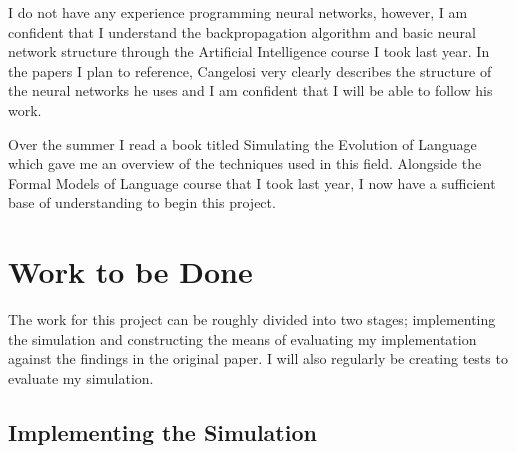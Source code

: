 \documentclass[12pt,a4paper,twoside]{article}
\begin{document}
I do not have any experience programming neural networks, however, I am confident that I understand the backpropagation algorithm and basic neural network structure through the Artificial Intelligence course I took last year. In the papers I plan to reference, Cangelosi very clearly describes the structure of the neural networks he uses and I am confident that I will be able to follow his work.

Over the summer I read a book titled Simulating the Evolution of Language which gave me an overview of the techniques used in this field. Alongside the Formal Models of Language course that I took last year, I now have a sufficient base of understanding to begin this project.

\section*{Work to be Done}

The work for this project can be roughly divided into two stages; implementing the simulation and constructing the means of evaluating my implementation against the findings in the original paper. I will also regularly be creating tests to evaluate my simulation.

\subsection*{Implementing the Simulation}
\end{document}
